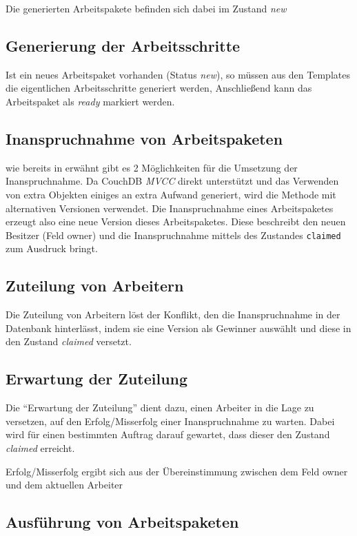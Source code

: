 Die generierten Arbeitspakete befinden sich dabei im Zustand \textit{new}

\subsection{Generierung der Arbeitsschritte}

Ist ein neues Arbeitspaket vorhanden (Status \textit{new}), so müssen aus den Templates die eigentlichen Arbeitsschritte generiert werden,
Anschließend kann das Arbeitspaket als \textit{ready} markiert werden.

\subsection{Inanspruchnahme von Arbeitspaketen}

wie bereits in  erwähnt gibt es 2 Möglichkeiten für die Umsetzung der Inanspruchnahme.
Da CouchDB \emph{MVCC} direkt unterstützt und das Verwenden von extra Objekten einiges an extra Aufwand generiert, wird die Methode mit alternativen Versionen verwendet.
Die Inanspruchnahme eines Arbeitspaketes erzeugt also eine neue Version dieses Arbeitspaketes.
Diese beschreibt den neuen Besitzer (Feld owner) und die Inanspruchnahme mittels des Zustandes \verb|claimed|
zum Ausdruck bringt.

\subsection{Zuteilung von Arbeitern}
Die Zuteilung von Arbeitern löst der Konflikt,
den die Inanspruchnahme in der Datenbank hinterlässt,
indem sie eine Version als Gewinner auswählt und
diese in den Zustand \textit{claimed} versetzt.

\subsection{Erwartung der Zuteilung}

Die ``Erwartung der Zuteilung'' dient dazu,
einen Arbeiter in die Lage zu versetzen,
auf den Erfolg/Misserfolg einer Inanspruchnahme zu warten.
Dabei wird für einen bestimmten Auftrag darauf gewartet,
dass dieser den Zustand \textit{claimed} erreicht.

Erfolg/Misserfolg ergibt sich aus der Übereinstimmung zwischen dem Feld owner und dem aktuellen Arbeiter

\subsection{Ausführung von Arbeitspaketen}

